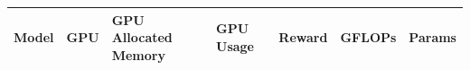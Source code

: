 \documentclass[preprint,12pt]{elsarticle}
\begin{document}


\begin{table}[h]\tiny
    \begin{tabularx}{\textwidth}
    {m{}<{\raggedright}m{}<{\raggedright}m{}<{\raggedright}m{}<{\raggedright}m{}<{\raggedright}m{}<{\raggedright}m{}<{\raggedright}}
    \hline
    \begin{center}\textbf{Model}\end{center} & \textbf{ GPU} & \textbf{GPU Allocated Memory} & \textbf{GPU Usage} & \begin{center}\textbf{Reward}\end{center} & \begin{center}\textbf{GFLOPs}\end{center} & \begin{center}\textbf{Params}\end{center}\\
    
    \hline
    

\end{tabularx}
\end{table}
\end{document}
